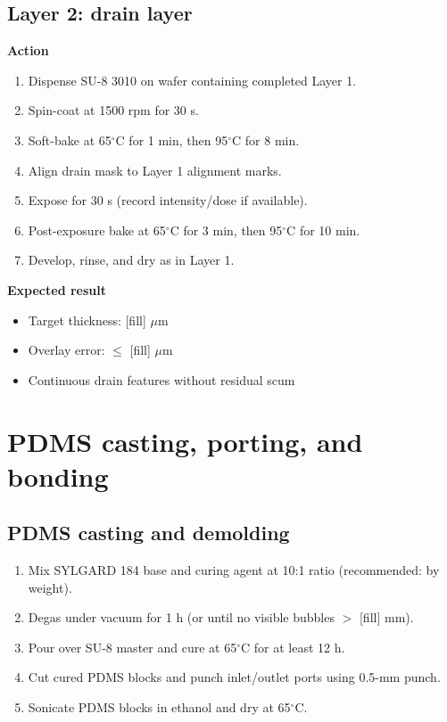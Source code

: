 \subsection{Layer 2: drain layer}
\textbf{Action}
\begin{enumerate}
  \item Dispense SU-8 3010 on wafer containing completed Layer 1.
  \item Spin-coat at 1500 rpm for 30 s.
  \item Soft-bake at 65$^{\circ}$C for 1 min, then 95$^{\circ}$C for 8 min.
  \item Align drain mask to Layer 1 alignment marks.
  \item Expose for 30 s (record intensity/dose if available).
  \item Post-exposure bake at 65$^{\circ}$C for 3 min, then 95$^{\circ}$C for 10 min.
  \item Develop, rinse, and dry as in Layer 1.
\end{enumerate}

\textbf{Expected result}
\begin{itemize}
  \item Target thickness: [fill] $\mu$m
  \item Overlay error: $\leq$ [fill] $\mu$m
  \item Continuous drain features without residual scum
\end{itemize}

\section{PDMS casting, porting, and bonding}

\subsection{PDMS casting and demolding}
\begin{enumerate}
  \item Mix SYLGARD 184 base and curing agent at 10:1 ratio (recommended: by weight).
  \item Degas under vacuum for 1 h (or until no visible bubbles $>$ [fill] mm).
  \item Pour over SU-8 master and cure at 65$^{\circ}$C for at least 12 h.
  \item Cut cured PDMS blocks and punch inlet/outlet ports using 0.5-mm punch.
  \item Sonicate PDMS blocks in ethanol and dry at 65$^{\circ}$C.
\end{enumerate}

